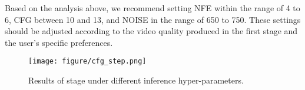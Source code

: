 Based on the analysis above, we recommend setting NFE within the range of 4 to 6, CFG between 10 and 13, and NOISE in the range of 650 to 750. These settings should be adjusted according to the video quality produced in the first stage and the user's specific preferences.

\begin{figure}[!t]
\begin{center}
\texttt{[image: figure/cfg\_step.png]}
\end{center}
\caption{Results of stage  under different inference hyper-parameters. }
\label{fig:ab_inf}
\end{figure}









